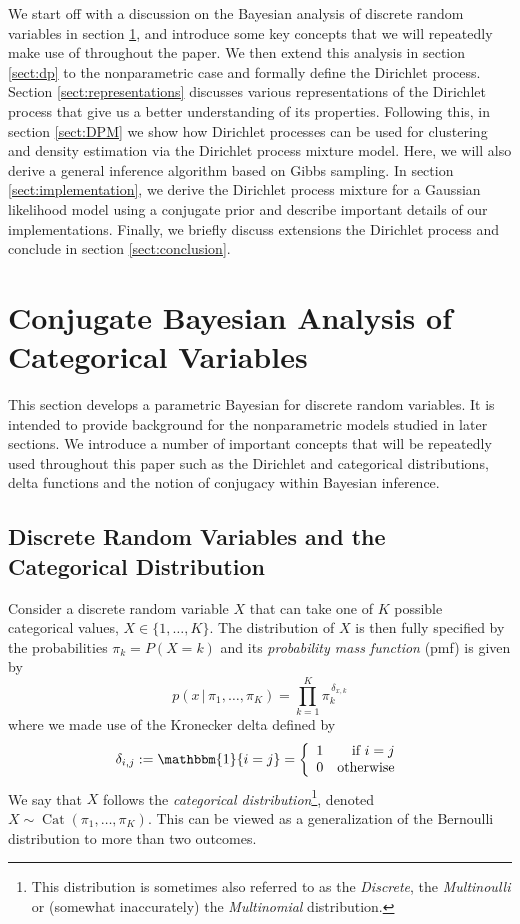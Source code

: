 \documentclass[final,3p,times,twocolumn]{elsarticle}
\DeclareMathOperator*{\Cat}{Cat}
\begin{document}
We start off with a discussion on the Bayesian analysis of discrete random variables in section \ref{sect:parametric}, and introduce some key concepts that we will repeatedly make use of throughout the paper.
We then extend this analysis in section \ref{sect:dp} to the nonparametric case and formally define the Dirichlet process.
Section \ref{sect:representations} discusses various representations of the Dirichlet process that give us a better understanding of its properties.
Following this, in section \ref{sect:DPM} we show how Dirichlet processes can be used for clustering and density estimation via the Dirichlet process mixture model. 
Here, we will also derive a general inference algorithm based on Gibbs sampling.
In section \ref{sect:implementation}, we derive the Dirichlet process mixture for a Gaussian likelihood model using a conjugate prior and describe important details of our implementations.
Finally, we briefly discuss extensions the Dirichlet process and conclude in section \ref{sect:conclusion}.


\section{Conjugate Bayesian Analysis of Categorical Variables}
\label{sect:parametric}
This section develops a parametric Bayesian for discrete random variables.
It is intended to provide background for the nonparametric models studied in later sections.
We introduce a number of important concepts that will be repeatedly used throughout this paper such as the Dirichlet and categorical distributions, delta functions and the notion of conjugacy within Bayesian inference. 

\subsection{Discrete Random Variables and the Categorical Distribution}
Consider a discrete random variable $X$ that can take one of $K$ possible categorical values, $X \in \{1,\dots,K\}$.
The distribution of $X$ is then fully specified by the probabilities $\pi_k = P(X = k)$ and its \emph{probability mass function} (pmf) is given by
\begin{equation*}
p(x\,|\,\pi_1,\dots,\pi_K) = \prod_{k=1}^K \pi_k^{\,\delta_{x,k}}
\end{equation*}
where we made use of the Kronecker delta defined by
\begin{equation*}
\delta_{i,j} := \mathbbm{1}\{i = j\} = \left\{\begin{array}{lr}
1 & \mbox{if $i = j$}\\
0 & \mbox{otherwise} \end{array} \right.
\end{equation*}
We say that $X$ follows the \emph{categorical distribution}\footnote{This distribution is sometimes also referred to as the \emph{Discrete}, the \emph{Multinoulli} or (somewhat inaccurately) the \emph{Multinomial} distribution.}, denoted $X \sim \Cat(\pi_1, \dots, \pi_K)$.
This can be viewed as a generalization of the Bernoulli distribution to more than two outcomes.
\end{document}
